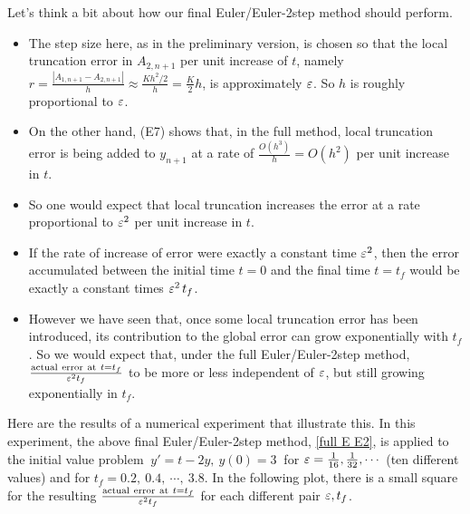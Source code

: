 Let's think a bit about how our final Euler/Euler-2step method should perform.
\begin{itemize}
\item
The step size here, as in the preliminary version, is chosen so that
the local truncation error in $A_{2,n+1}$ per unit increase of $t$,
namely $r=\frac{|A_{1,n+1}-A_{2,n+1}|}{h}\approx\frac{Kh^2/2}{h}=\frac{K}{2}h$, 
is approximately $\varepsilon$. So $h$ is roughly proportional to $\varepsilon$. 
\item
On the other hand, (E7) shows that, in the full method, local truncation 
error is being added to $y_{n+1}$ at a rate of $\frac{O(h^3)}{h}=O(h^2)$ 
per unit increase in $t$. 
\item
So one would expect that local truncation increases the error at a rate proportional to $\varepsilon^2$ per unit increase in $t$. 
\item
If the rate of increase of error were exactly a constant time $\varepsilon^2$, 
then the error accumulated between the initial time $t=0$ and the final 
time $t=t_f$ would be exactly a constant times $\varepsilon^2\,t_f$. 
\item
However we have seen that, once some local truncation error has been introduced, its contribution to the global error can grow exponentially with $t_f$. So we would expect that, under the full Euler/Euler-2step method, 
$\frac{{\rm actual\ error\ at\ }t=t_f}{\varepsilon^2 t_f}$ to be more or less independent of $\varepsilon$, but still growing exponentially in $t_f$.
\end{itemize}
Here are the results of a numerical experiment that illustrate this. 
In this experiment, the above final Euler/Euler-2step method, 
\eqref{full E E2}, is applied to the initial value problem
$\ 
y'=t-2y,\ 
y(0)=3
\ $
for $\varepsilon=\frac{1}{16},\frac{1}{32},\cdots$ (ten different values)
and for $t_f=0.2,\ 0.4,\ \cdots,\ 3.8$. In the following plot, there is a small 
square for the resulting $\frac{{\rm actual\ error\ at\ }t=t_f}{\varepsilon^2 t_f}$ 
for each different pair $\varepsilon,t_f$.


